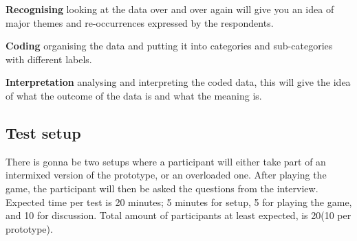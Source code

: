     \textbf{Recognising} looking at the data over and over again will give you an idea of major themes and re-occurrences expressed by the respondents\cite{bjoernerBog}. 
    
    \textbf{Coding} organising the data and putting it into categories and sub-categories with different labels\cite{bjoernerBog}.
    
    \textbf{Interpretation} analysing and interpreting the coded data, this will give the idea of what the outcome of the data is and what the meaning is\cite{bjoernerBog}.
    
    \subsection{Test setup}
    There is gonna be two setups where a participant will either take part of an intermixed version of the prototype, or an overloaded one. After playing the game, the participant will then be asked the questions from the interview. Expected time per test is 20 minutes; 5 minutes for setup, 5 for playing the game, and 10 for discussion. Total amount of participants at least expected, is 20(10 per prototype).